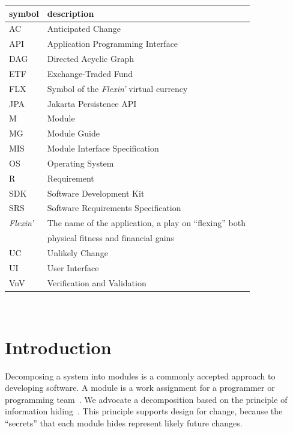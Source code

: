 \documentclass[12pt, titlepage]{article}
\begin{document}
\renewcommand{\arraystretch}{1.2}
\begin{tabular}{l l}
  \toprule
  \textbf{symbol} & \textbf{description}\\
  \midrule
  AC & Anticipated Change\\
  API & Application Programming Interface\\
  DAG & Directed Acyclic Graph\\
  ETF & Exchange-Traded Fund\\
  FLX & Symbol of the \textit{Flexin'} virtual currency\\
  JPA & Jakarta Persistence API\\
  M & Module\\
  MG & Module Guide\\
  MIS & Module Interface Specification\\
  OS & Operating System\\
  R & Requirement\\
  SDK & Software Development Kit\\
  SRS & Software Requirements Specification\\
  \textit{Flexin'} & The name of the application, a play on ``flexing'' both\\
  & physical fitness and financial gains\\
  UC & Unlikely Change\\
  UI & User Interface\\
  VnV & Verification and Validation\\
  \bottomrule
\end{tabular}\\

\newpage

\tableofcontents

\listoftables

\listoffigures

\newpage


\section{Introduction}

Decomposing a system into modules is a commonly accepted approach to developing
software.  A module is a work assignment for a programmer or programming
team~\citep{ParnasEtAl1984}.  We advocate a decomposition
based on the principle of information hiding~\citep{Parnas1972a}.  This
principle supports design for change, because the ``secrets'' that each module
hides represent likely future changes.
\end{document}
